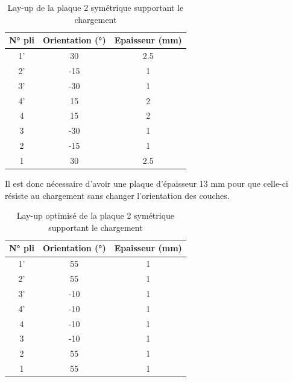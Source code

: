 \documentclass[a4paper,12pt]{article}
\begin{document}
\begin{table}[h!]
	\renewcommand{\arraystretch}{1.2} %
	\centering
	\begin{tabular}{c|c|c}
		\textbf{N° pli} & \textbf{Orientation (°)} & \textbf{Epaisseur (mm)} \\
		\hline
		1'         & 30             & 2.5         \\
		2'          & -15              & 1          \\
		3'          & -30              & 1            \\
		4'         & 15              & 2            \\
		4         & 15              & 2            \\
		3          & -30              & 1            \\
		2          & -15              & 1          \\
		1         & 30             & 2.5         \\
	\end{tabular}
	\caption{Lay-up de la plaque 2 symétrique supportant le chargement}
	\label{tab:lay up opti epaisseur}
\end{table}

Il est donc nécessaire d'avoir une plaque d'épaisseur 13 mm pour que celle-ci résiste au chargement sans changer l'orientation des couches.

\begin{table}[h!]
	\renewcommand{\arraystretch}{1.2} %
	\centering
	\begin{tabular}{c|c|c}
		\textbf{N° pli} & \textbf{Orientation (°)} & \textbf{Epaisseur (mm)} \\
		\hline
		1'         & 55             & 1        \\
		2'          & 55            & 1          \\
		3'          & -10             & 1           \\
		4'         & -10              & 1           \\
		4         & -10              & 1           \\
		3          & -10             & 1           \\
		2          & 55            & 1          \\
		1         & 55             & 1        \\
	\end{tabular}
	\caption{Lay-up optimisé de la plaque 2 symétrique supportant le chargement}
	\label{tab:lay up opti epaisseur orientation}
\end{table}
\end{document}
